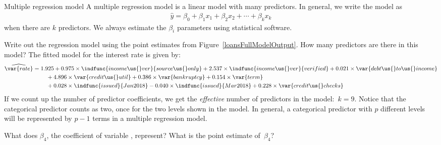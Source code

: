 \begin{onebox}{Multiple regression model}
  A multiple regression model is a linear model
  with many predictors.
  In general, we write the model as
  \begin{align*}
  \hat{y} =
      \beta_0 + \beta_1 x_1 + \beta_2 x_2 + \cdots + \beta_k x_k
  \end{align*}
  when there are $k$ predictors.
  We always estimate the $\beta_i$ parameters using
  statistical software.
\end{onebox}

\begin{examplewrap}
\begin{nexample}{Write out the regression model using
    the point estimates from
    Figure~\ref{loansFullModelOutput}.
    How many predictors are there in this model?}
  \label{loansFullModelEqWCoef}%
  The fitted model for the interest rate is given by:
  {\small\begin{align*}
  \widehat{\var{rate}}
	&= 1.925 +
	    0.975 \times \indfunc{income\us{}ver}{source\us{}only} +
	    2.537 \times \indfunc{income\us{}ver}{verified} +
		0.021 \times \var{debt\us{}to\us{}income} \\
	&\qquad\  +
	    4.896 \times \var{credit\us{}util} +
	    0.386 \times \var{bankruptcy} +
		0.154 \times \var{term} \\
	&\qquad\  +
	    0.028 \times \indfunc{issued}{Jan2018}
	    -0.040 \times \indfunc{issued}{Mar2018} +
		0.228 \times \var{credit\us{}checks}
  \end{align*}}%
  If we count up the number of predictor coefficients,
  we get the \emph{effective} number of predictors
  in the model:~$k = 9$.
  Notice that the  categorical predictor
  counts as two, once for the two levels shown in the model.
  In general, a categorical predictor with $p$ different
  levels will be represented by $p - 1$ terms in a multiple
  regression model.
\end{nexample}
\end{examplewrap}


\begin{exercisewrap}
\begin{nexercise}
What does $\beta_4$, the coefficient of variable
, represent?
What is the point estimate of~$\beta_4$?\footnotemark
\end{nexercise}
\end{exercisewrap}

